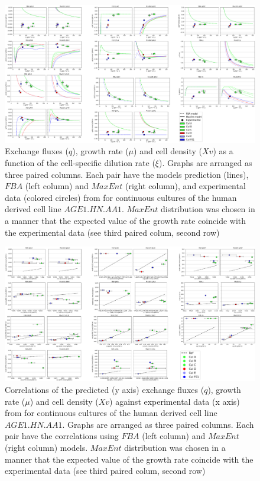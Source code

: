 \documentclass[]{article}
\begin{document}
	\begin{figure}
		\centering
		\includegraphics[scale = 0.6]{plots_q_Human}
		\caption{Exchange fluxes ($q$), growth rate ($\mu$) and cell density ($Xv$) as a function of the cell-specific dilution rate ($\xi$). Graphs are arranged as three paired columns. Each pair have the models prediction (lines),  $FBA$ (left column) and $MaxEnt$ (right column), and experimental data (colored circles) from \protect{} for continuous cultures of the human derived cell line $AGE1.HN.AA1$. $MaxEnt$ distribution was chosen in a manner that the expected value of the growth rate coincide with the experimental data (see third paired colum, second row)} 
	\end{figure}

	\begin{figure}
		\centering
		\includegraphics[scale = 0.6]{corr_q_Human}
		\caption{Correlations of the predicted (y axis) exchange fluxes ($q$), growth rate ($\mu$) and cell density ($Xv$) against experimental data (x axis) from \protect{} for continuous cultures of the human derived cell line $AGE1.HN.AA1$. Graphs are arranged as three paired columns. Each pair have the correlations using $FBA$ (left column) and $MaxEnt$ (right column) models. $MaxEnt$ distribution was chosen in a manner that the expected value of the growth rate coincide with the experimental data (see third paired colum, second row)}
	\end{figure}
\end{document}
